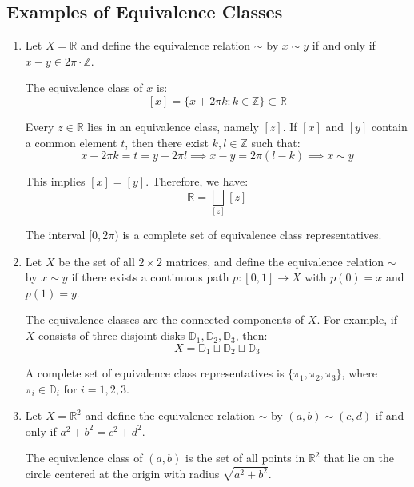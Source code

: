\documentclass[11pt]{article}
\begin{document}
\subsection{Examples of Equivalence Classes}
\begin{enumerate}
    \item Let $X = \mathbb{R}$ and define the equivalence relation $\sim$ by $x \sim y$
          if and only if $x - y \in 2\pi \cdot \mathbb{Z}$.

          The equivalence class of $x$ is:
          \[
              [x] = \{ x + 2\pi k : k \in \mathbb{Z} \} \subset \mathbb{R}
          \]

          Every $z \in \mathbb{R}$ lies in an equivalence class, namely $[z]$. If $[x]$
          and $[y]$ contain a common element $t$, then there exist $k, l \in \mathbb{Z}$
          such that:
          \[
              x + 2\pi k = t = y + 2\pi l \implies x - y = 2\pi (l - k) \implies x \sim y
          \]

          This implies $[x] = [y]$. Therefore, we have:
          \[
              \mathbb{R} = \bigsqcup_{[z]} [z]
          \]

          The interval $[0, 2\pi)$ is a complete set of equivalence class
          representatives.

    \item Let $X$ be the set of all $2 \times 2$ matrices, and define the equivalence
          relation $\sim$ by $x \sim y$ if there exists a continuous path $p: [0,1]
              \rightarrow X$ with $p(0) = x$ and $p(1) = y$.

          The equivalence classes are the connected components of $X$. For example, if
          $X$ consists of three disjoint disks $\mathbb{D}_1, \mathbb{D}_2,
              \mathbb{D}_3$, then:
          \[
              X = \mathbb{D}_1 \sqcup \mathbb{D}_2 \sqcup \mathbb{D}_3
          \]

          A complete set of equivalence class representatives is $\{\pi_1, \pi_2,
              \pi_3\}$, where $\pi_i \in \mathbb{D}_i$ for $i = 1, 2, 3$.

    \item Let $X = \mathbb{R}^2$ and define the equivalence relation $\sim$ by $(a, b)
              \sim (c, d)$ if and only if $a^2 + b^2 = c^2 + d^2$.

          The equivalence class of $(a, b)$ is the set of all points in $\mathbb{R}^2$
          that lie on the circle centered at the origin with radius $\sqrt{a^2 + b^2}$.
\end{enumerate}
\end{document}

